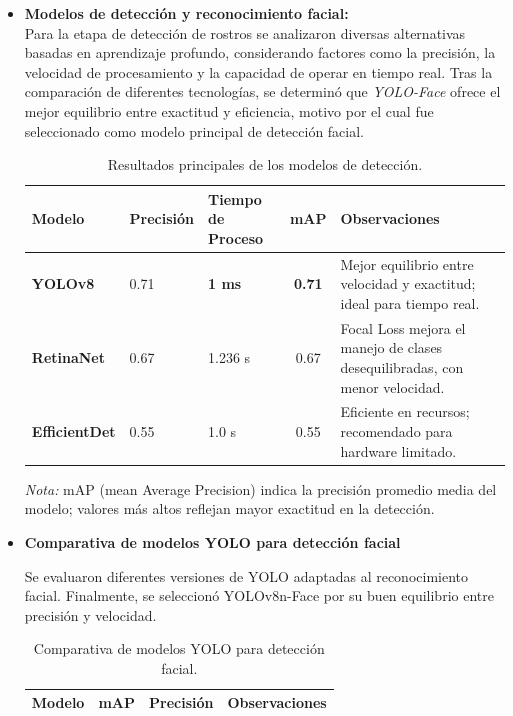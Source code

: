 \begin{itemize}

\item \textbf{Modelos de detección y reconocimiento facial:} \\
Para la etapa de detección de rostros se analizaron diversas alternativas basadas en aprendizaje profundo, considerando factores como la precisión, la velocidad de procesamiento y la capacidad de operar en tiempo real. Tras la comparación de diferentes tecnologías, se determinó que \textit{YOLO-Face} ofrece el mejor equilibrio entre exactitud y eficiencia, motivo por el cual fue seleccionado como modelo principal de detección facial. 

\begin{table}[H]
\centering
\caption{Resultados principales de los modelos de detección\cite{fatima2024yolov8}.}
\label{tab:comparacion-modelos}
\renewcommand{\arraystretch}{1.3}
\normalsize
\setlength{\tabcolsep}{3pt}
\begin{tabular}{|l|p{2cm}|p{2.7cm}|c|p{4.1cm}|}
\hline
\textbf{Modelo} & \textbf{Precisión} & \textbf{Tiempo de Proceso} & \textbf{mAP} & \textbf{Observaciones} \\
\hline
\textbf{YOLOv8}      & 0.71 & \textbf{1 ms}  & \textbf{0.71}  &
Mejor equilibrio entre velocidad y exactitud; ideal para tiempo real. \\
\hline
\textbf{RetinaNet}   & 0.67 & 1.236 s & 0.67 &
Focal Loss mejora el manejo de clases desequilibradas, con menor velocidad. \\
\hline
\textbf{EfficientDet} & 0.55 & 1.0 s & 0.55 &
Eficiente en recursos; recomendado para hardware limitado. \\
\hline
\end{tabular}
\end{table}

\textit{Nota:} mAP (mean Average Precision) indica la precisión promedio media del modelo; valores más altos reflejan mayor exactitud en la detección.


\item \textbf{Comparativa de modelos YOLO para detección facial}

Se evaluaron diferentes versiones de YOLO adaptadas al reconocimiento facial. Finalmente, se seleccionó YOLOv8n-Face por su buen equilibrio entre precisión y velocidad.


\begin{table}[H]
    \centering
    \caption{Comparativa de modelos YOLO para detección facial\cite{yolov8face2024}.}
    \label{tab:comparativa_yolo}
    \renewcommand{\arraystretch}{1.3}
    \small
    \begin{tabular}{|p{3.2cm}|p{1.5cm}|p{1.8cm}|p{5.3cm}|}
        \hline
        \textbf{Modelo} & \textbf{mAP} & \textbf{Precisión} & \textbf{Observaciones} \\ \hline


\end{tabular}
\end{table}
\end{itemize}
